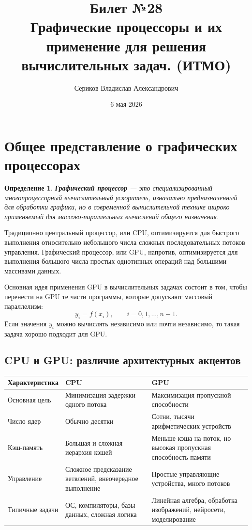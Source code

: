 \documentclass[12pt,a4paper]{article}
\title{Билет №28 \\ \small Графические процессоры и их применение для решения вычислительных задач. (ИТМО)}
\author{Сериков Владислав Александрович}
\date{6 мая 2026}
\newtheorem{definition}{Определение}
\begin{document}
\maketitle
\tableofcontents
\newpage

\section{Общее представление о графических процессорах}

\begin{definition}
\textbf{Графический процессор} --- это специализированный многопроцессорный вычислительный ускоритель, изначально предназначенный для обработки графики, но в современной вычислительной технике широко применяемый для массово-параллельных вычислений общего назначения.
\end{definition}

Традиционно центральный процессор, или CPU, оптимизируется для быстрого выполнения относительно небольшого числа сложных последовательных потоков управления. Графический процессор, или GPU, напротив, оптимизируется для выполнения большого числа простых однотипных операций над большими массивами данных.

Основная идея применения GPU в вычислительных задачах состоит в том, чтобы перенести на GPU те части программы, которые допускают массовый параллелизм:
\[
    y_i = f(x_i), \qquad i = 0,1,\dots,n-1.
\]
Если значения $y_i$ можно вычислять независимо или почти независимо, то такая задача хорошо подходит для GPU.

\subsection{CPU и GPU: различие архитектурных акцентов}

\begin{center}
\begin{tabular}{p{}p{}p{}}
\toprule
\textbf{Характеристика} & \textbf{CPU} & \textbf{GPU} \\
\midrule
Основная цель & Минимизация задержки одного потока & Максимизация пропускной способности \\
Число ядер & Обычно десятки & Сотни, тысячи арифметических устройств \\
Кэш-память & Большая и сложная иерархия кэшей & Меньше кэша на поток, но высокая пропускная способность памяти \\
Управление & Сложное предсказание ветвлений, внеочередное выполнение & Простые управляющие устройства, много потоков \\
Типичные задачи & ОС, компиляторы, базы данных, сложная логика & Линейная алгебра, обработка изображений, нейросети, моделирование \\
\bottomrule
\end{tabular}
\end{center}
\end{document}
